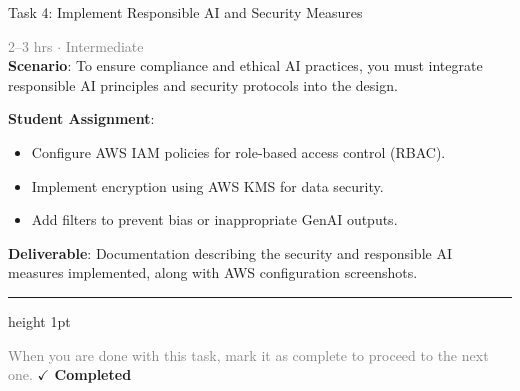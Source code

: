 \documentclass[10pt,a4paper]{article}
\begin{document}
\begin{taskbox}{Task 4: Implement Responsible AI and Security Measures}

    {\small \textcolor{gray}{2--3 hrs $\cdot$ Intermediate}}\\[12pt]

    \textbf{Scenario}: To ensure compliance and ethical AI practices, you must integrate responsible AI principles and security protocols into the design.  

\textbf{Student Assignment}:  
\begin{itemize}
    \item Configure AWS IAM policies for role-based access control (RBAC).  
    \item Implement encryption using AWS KMS for data security.  
    \item Add filters to prevent bias or inappropriate GenAI outputs.  
\end{itemize}

\textbf{Deliverable}: Documentation describing the security and responsible AI measures implemented, along with AWS configuration screenshots.\par

    \vspace{16pt}

    \textcolor{cardBorder}{\hrule height 1pt}\vspace{8pt}

    \small \textcolor{gray}{When you are done with this task, mark it as complete to proceed to the next one.} \hfill \textbf{\textcolor{brandDark}{$\checkmark$ Completed}}

\end{taskbox}
\end{document}
